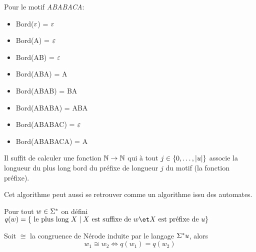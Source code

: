 \begin{exemple}
	Pour le motif \emph{ABABACA}:

	\begin{itemize}
		\item Bord($\varepsilon$) = $\varepsilon$
		\item Bord(A) = $\varepsilon$
		\item Bord(AB) = $\varepsilon$
		\item Bord(ABA) = A
		\item Bord(ABAB) = BA
		\item Bord(ABABA) = ABA
		\item Bord(ABABAC) = $\varepsilon$
		\item Bord(ABABACA) = A
	\end{itemize}
\end{exemple}

Il suffit de calculer une fonction $\mathbb{N} \to \mathbb{N}$ qui à tout $j \in \left\{0,\ldots,|u|\right\}$ associe
la longueur du plus long bord du préfixe de longueur $j$ du motif (la fonction préfixe).


Cet algorithme peut aussi se retrouver comme un algorithme issu des automates.


\begin{definition}
	Pour tout $w \in \Sigma^{*}$ on défini
	$q(w) = \setdef {\text{ le plus long } X} {X \text{ est suffixe de } w \et X \text{ est préfixe de } u}$
\end{definition}

\begin{prop}
	Soit $\cong$ la congruence de Nérode induite par le langage $\Sigma^{*} u$, alors
	$$ w_1 \cong w_2 \iff q(w_1) = q(w_2)$$
\end{prop}

